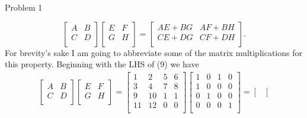 \begin{problem}{Problem 1}
\begin{highlight}[Solution]
        \begin{equation}
            \begin{bmatrix}
                A & B \\
                C & D \\
            \end{bmatrix}
            \begin{bmatrix}
                E & F \\
                G & H \\
            \end{bmatrix}
            = 
            \begin{bmatrix}
                AE + BG & AF + BH \\
                CE + DG & CF + DH \\
            \end{bmatrix}.
        \end{equation}
        For brevity's sake I am going to abbreviate some of the matrix multiplications for this property. Beginning with the LHS of (9) we have
        \begin{align*}
            \begin{bmatrix}
                A & B \\
                C & D \\
            \end{bmatrix}
            \begin{bmatrix}
                E & F \\
                G & H \\
            \end{bmatrix}
            = 
            \begin{bmatrix}
                1 & 2 & 5 & 6 \\
                3 & 4 & 7 & 8 \\
                9 & 10 & 1 & 1 \\
                11 & 12 & 0 & 0 \\
            \end{bmatrix}
            \begin{bmatrix}
                1 & 0 & 1 & 0 \\
                1 & 0 & 0 & 0 \\
                0 & 1 & 0 & 0 \\
                0 & 0 & 0 & 1 \\
            \end{bmatrix}
            = 
            \begin{bmatrix}

\end{bmatrix}
\end{align*}
\end{highlight}
\end{problem}
